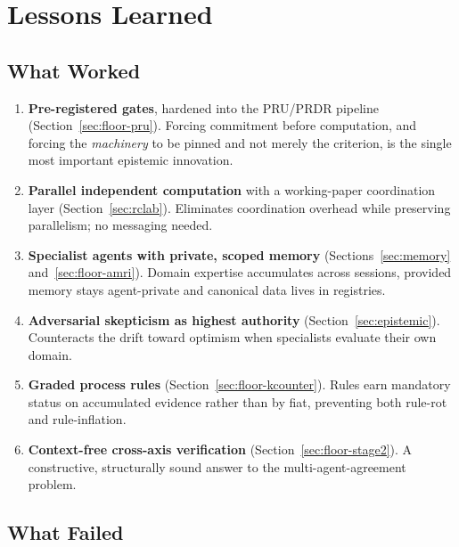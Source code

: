 \documentclass[12pt,a4paper]{article}
\begin{document}
\section{Lessons Learned}
\label{sec:lessons}

\subsection{What Worked}

\begin{enumerate}
    \item \textbf{Pre-registered gates}, hardened into the PRU/PRDR pipeline (Section~\ref{sec:floor-pru}). Forcing commitment before computation, and forcing the \emph{machinery} to be pinned and not merely the criterion, is the single most important epistemic innovation.
    \item \textbf{Parallel independent computation} with a working-paper coordination layer (Section~\ref{sec:rclab}). Eliminates coordination overhead while preserving parallelism; no messaging needed.
    \item \textbf{Specialist agents with private, scoped memory} (Sections~\ref{sec:memory} and~\ref{sec:floor-amri}). Domain expertise accumulates across sessions, provided memory stays agent-private and canonical data lives in registries.
    \item \textbf{Adversarial skepticism as highest authority} (Section~\ref{sec:epistemic}). Counteracts the drift toward optimism when specialists evaluate their own domain.
    \item \textbf{Graded process rules} (Section~\ref{sec:floor-kcounter}). Rules earn mandatory status on accumulated evidence rather than by fiat, preventing both rule-rot and rule-inflation.
    \item \textbf{Context-free cross-axis verification} (Section~\ref{sec:floor-stage2}). A constructive, structurally sound answer to the multi-agent-agreement problem.
\end{enumerate}

\subsection{What Failed}
\end{document}
